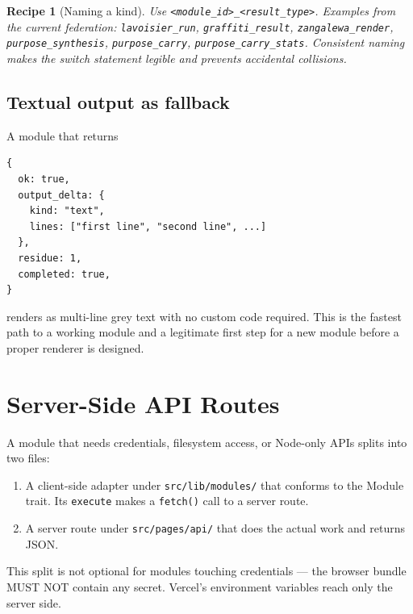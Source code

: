 \documentclass[11pt,a4paper]{article}
\theoremstyle{contract}
\newtheorem{recipe}[contract]{Recipe}
\begin{document}
\begin{recipe}[Naming a kind]
\label{recipe:kind}
Use \texttt{<module\_id>\_<result\_type>}. Examples from the current
federation: \texttt{lavoisier\_run}, \texttt{graffiti\_result},
\texttt{zangalewa\_render}, \texttt{purpose\_synthesis},
\texttt{purpose\_carry}, \texttt{purpose\_carry\_stats}. Consistent
naming makes the switch statement legible and prevents accidental
collisions.
\end{recipe}

\subsection{Textual output as fallback}

A module that returns

\begin{lstlisting}
{
  ok: true,
  output_delta: {
    kind: "text",
    lines: ["first line", "second line", ...]
  },
  residue: 1,
  completed: true,
}
\end{lstlisting}

renders as multi-line grey text with no custom code required. This is
the fastest path to a working module and a legitimate first step for a
new module before a proper renderer is designed.

\section{Server-Side API Routes}
\label{sec:server}

A module that needs credentials, filesystem access, or Node-only APIs
splits into two files:

\begin{enumerate}[nosep,leftmargin=1.4em]
\item A client-side adapter under \texttt{src/lib/modules/} that
conforms to the Module trait. Its \texttt{execute} makes a
\texttt{fetch()} call to a server route.
\item A server route under \texttt{src/pages/api/} that does the
actual work and returns JSON.
\end{enumerate}

This split is not optional for modules touching credentials --- the
browser bundle MUST NOT contain any secret. Vercel's environment
variables reach only the server side.
\end{document}
